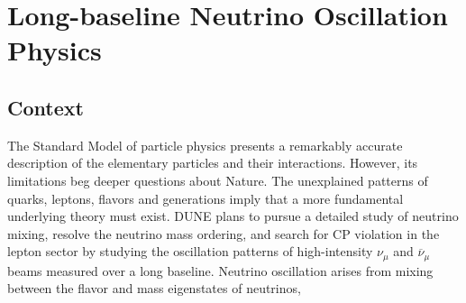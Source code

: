 \chapter{Long-baseline Neutrino Oscillation Physics}
\label{ch:physics-lbnosc}

\section{Context}
\label{sec:physics-lbnosc-context}

The Standard Model of particle physics 
presents a remarkably accurate
description of the elementary particles and their
interactions. However, its limitations beg deeper questions about
Nature. The unexplained patterns of quarks, leptons, flavors and
generations imply that a more fundamental underlying theory must
exist.  
DUNE plans to pursue a detailed
study of neutrino mixing, resolve the neutrino mass ordering,
and search for CP violation in the lepton sector by
studying the oscillation patterns of high-intensity
$\nu_\mu$ and $\overline{\nu}_\mu$ beams measured over a long baseline. 
%  
%
Neutrino oscillation arises from mixing between the flavor and mass eigenstates of neutrinos,
